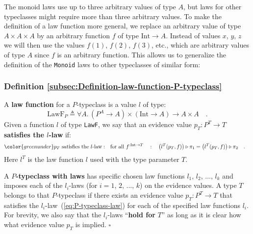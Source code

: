 The monoid laws use up to three arbitrary values of type $A$, but
laws for other typeclasses might require more than three arbitrary
values. To make the definition of a law function more general, we
replace an arbitrary value of type $A\times A\times A$ by an arbitrary
function $f$ of type $\text{Int}\rightarrow A$. Instead of values
$x$, $y$, $z$ we will then use the values $f(1)$, $f(2)$, $f(3)$,
etc., which are arbitrary values of type $A$ since $f$ is an arbitrary
function. This allows us to generalize the definition of the \lstinline!Monoid!
laws to other typeclasses of similar form:

\subsubsection{Definition \label{subsec:Definition-law-function-P-typeclass}\ref{subsec:Definition-law-function-P-typeclass}}

A \textbf{law function} for a $P$-typeclass 
 is a value $l$ of type:
\begin{equation}
\text{LawF}_{P}\triangleq\forall A.\,(P^{A}\rightarrow A)\times(\text{Int}\rightarrow A)\rightarrow A\times A\quad.\label{eq:P-typeclass-law-type}
\end{equation}
Given a function $l$ of type \lstinline!LawF!,
we say that an evidence value $p_{T}:P^{T}\rightarrow T$ \textbf{satisfies
the $l$-law} if:
\begin{align}
{\color{greenunder}p_{T}\text{ satisfies the }l\text{-law}:}\quad & \text{for all }f^{:\text{Int}\rightarrow T}\quad:\quad\big(l^{T}(p_{T},f)\big)\triangleright\pi_{1}=\big(l^{T}(p_{T},f)\big)\triangleright\pi_{2}\quad.\label{eq:P-typeclass-law}
\end{align}
Here $l^{T}$ is the law function $l$ used with the type parameter
$T$.

A $P$\textbf{-typeclass with laws} has
specific chosen law functions $l_{1}$, $l_{2}$, ..., $l_{k}$ and
imposes each of the $l_{i}$-laws (for $i=1$, $2$, ..., $k$) on
the evidence values. A type $T$ belongs to that $P$-typeclass if
there exists an evidence value $p_{T}:P^{T}\rightarrow T$ that satisfies
the $l_{i}$-law~(\ref{eq:P-typeclass-law}) for each of the specified
law functions $l_{i}$. For brevity, we also say that the $l_{i}$-laws
\textsf{``}\textbf{hold for} $T$\textsf{''} as long as it is clear how what evidence
value $p_{T}$ is implied. $\square$

